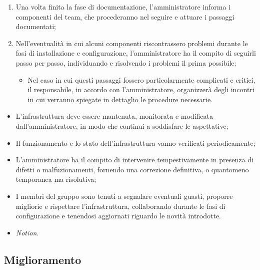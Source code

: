 \documentclass[10pt, a4paper]{article}
\begin{document}
\begin{enumerate}
    \item Una volta finita la fase di documentazione, l'amministratore informa i componenti del team, che procederanno nel seguire e attuare i passaggi documentati;
    \item Nell'eventualità in cui alcuni componenti riscontrassero problemi durante le fasi di installazione e configurazione, l'amministratore ha il compito di seguirli passo per passo, individuando e risolvendo i problemi il prima possibile:
    \begin{itemize}
        \item Nel caso in cui questi passaggi fossero particolarmente complicati e critici, il responsabile, in accordo con l'amministratore, organizzerà degli incontri in cui verranno spiegate in dettaglio le procedure necessarie.
    \end{itemize}
    
\end{enumerate}



\begin{itemize}
    \item L'infrastruttura deve essere mantenuta, monitorata e modificata dall'amministratore, in modo che continui a soddisfare le aspettative;
    \item Il funzionamento e lo stato dell'infrastruttura vanno verificati periodicamente;
    \item L'amministratore ha il compito di intervenire tempestivamente in presenza di difetti o malfuzionamenti, fornendo una correzione definitiva, o quantomeno temporanea ma risolutiva;
    \item I membri del gruppo sono tenuti a segnalare eventuali guasti, proporre migliorie e rispettare l'infrastruttura, collaborando durante le fasi di configurazione e tenendosi aggiornati riguardo le novità introdotte.
\end{itemize}

\begin{itemize}
    \item \textit{Notion}.
\end{itemize}

\subsection{Miglioramento}
\end{document}
